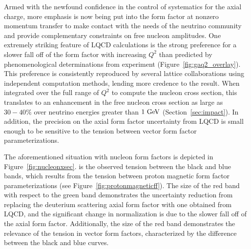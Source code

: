 Armed with the newfound confidence in the control of systematics for the axial charge,
 more emphasis is now being put into the form factor at nonzero momentum transfer
to make contact with the needs of the neutrino community and provide
 complementary constraints on free nucleon amplitudes.
One extremely striking feature of LQCD calculations is the strong preference for a slower
fall off of the form factor with increasing $Q^2$ than predicted by phenomenological determinations from experiment (Figure~\ref{fig:gaq2_overlay}).
This preference is consistently reproduced by several lattice collaborations using
independent computation methods, lending more credence to the result.
When integrated over the full range of $Q^2$ to compute the nucleon cross section,
this translates to an enhancement in the free nucleon cross section as large as $30-40\%$
over neutrino energies greater than $1~{\rm GeV}$ (Section~\ref{sec:impact}).
In addition, the precision on the axial form factor uncertainty from LQCD
is small enough to be sensitive to the tension between vector form factor parameterizations.

The aforementioned situation with nucleon form factors is depicted in Figure~\ref{fig:nucleonxsec}.
 is the observed tension between the black and blue bands,
 which results from the tension between proton magnetic form factor parameterizations
 (see Figure~\ref{fig:protonmagneticff}).
The size of the red band with respect to the green band demonstrates the uncertainty reduction from replacing the deuterium scattering axial form factor with one obtained from LQCD, and the significant change in normalization is due to the slower fall off of the axial form factor.
Additionally, the size of the red band demonstrates the relevance of the tension in vector form factors, characterized by the difference between the black and blue curves.


